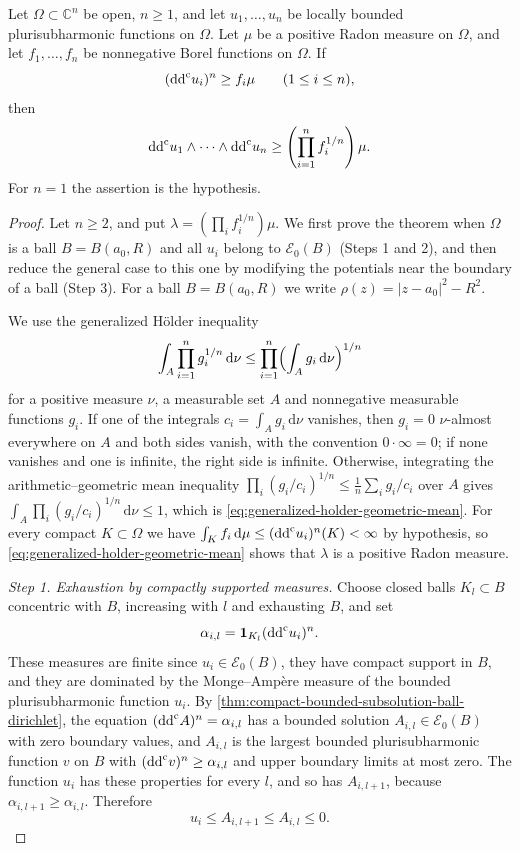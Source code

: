 \begin{theorem}\label{thm:bounded-multifactor-common-measure}
Let $\Omega\subset\mathbb C^n$ be open, $n\geq1$, and let $u_1,\ldots,u_n$ be locally bounded plurisubharmonic functions on $\Omega$. Let $\mu$ be a positive Radon measure on $\Omega$, and let $f_1,\ldots,f_n$ be nonnegative Borel functions on $\Omega$. If
\[
 (\mathrm{dd}^{\mathrm{c}} u_i)^n\geq f_i\mu\qquad(1\leq i\leq n),
\]
then
\begin{equation}\label{eq:bounded-multifactor-common-measure}
 \mathrm{dd}^{\mathrm{c}} u_1\wedge\cdots\wedge\mathrm{dd}^{\mathrm{c}} u_n
                  \geq\left(\prod_{i=1}^nf_i^{1/n}\right)\mu.
\end{equation}
For $n=1$ the assertion is the hypothesis.
\end{theorem}
\begin{proof}
Let $n\geq2$, and put $\lambda=(\prod_if_i^{1/n})\mu$. We first prove the theorem when $\Omega$ is a ball $B=B(a_0,R)$ and all $u_i$ belong to $\mathcal E_0(B)$ (Steps 1 and 2), and then reduce the general case to this one by modifying the potentials near the boundary of a ball (Step 3). For a ball $B=B(a_0,R)$ we write $\rho(z)=|z-a_0|^2-R^2$.

We use the generalized H\"older inequality
\begin{equation}\label{eq:generalized-holder-geometric-mean}
 \int_A\prod_{i=1}^ng_i^{1/n}\,\mathrm d\nu\leq\prod_{i=1}^n\Bigl(\int_Ag_i\,\mathrm d\nu\Bigr)^{1/n}
\end{equation}
for a positive measure $\nu$, a measurable set $A$ and nonnegative measurable functions $g_i$. If one of the integrals $c_i=\int_Ag_i\,\mathrm d\nu$ vanishes, then $g_i=0$ $\nu$-almost everywhere on $A$ and both sides vanish, with the convention $0\cdot\infty=0$; if none vanishes and one is infinite, the right side is infinite. Otherwise, integrating the arithmetic--geometric mean inequality $\prod_i(g_i/c_i)^{1/n}\leq\frac1n\sum_ig_i/c_i$ over $A$ gives $\int_A\prod_i(g_i/c_i)^{1/n}\,\mathrm d\nu\leq1$, which is \eqref{eq:generalized-holder-geometric-mean}. For every compact $K\subset\Omega$ we have $\int_Kf_i\,\mathrm d\mu\leq(\mathrm{dd}^{\mathrm{c}} u_i)^n(K)<\infty$ by hypothesis, so \eqref{eq:generalized-holder-geometric-mean} shows that $\lambda$ is a positive Radon measure.

\emph{Step 1. Exhaustion by compactly supported measures.}
Choose closed balls $K_l\subset B$ concentric with $B$, increasing with $l$ and exhausting $B$, and set
\[
 \alpha_{i,l}=\mathbf1_{K_l}(\mathrm{dd}^{\mathrm{c}} u_i)^n.
\]
These measures are finite since $u_i\in\mathcal E_0(B)$, they have compact support in $B$, and they are dominated by the Monge--Amp\`ere measure of the bounded plurisubharmonic function $u_i$. By \cref{thm:compact-bounded-subsolution-ball-dirichlet}, the equation $(\mathrm{dd}^{\mathrm{c}} A)^n=\alpha_{i,l}$ has a bounded solution $A_{i,l}\in\mathcal E_0(B)$ with zero boundary values, and $A_{i,l}$ is the largest bounded plurisubharmonic function $v$ on $B$ with $(\mathrm{dd}^{\mathrm{c}} v)^n\geq\alpha_{i,l}$ and upper boundary limits at most zero. The function $u_i$ has these properties for every $l$, and so has $A_{i,l+1}$, because $\alpha_{i,l+1}\geq\alpha_{i,l}$. Therefore
\[
 u_i\leq A_{i,l+1}\leq A_{i,l}\leq0.
\]


\end{proof}
